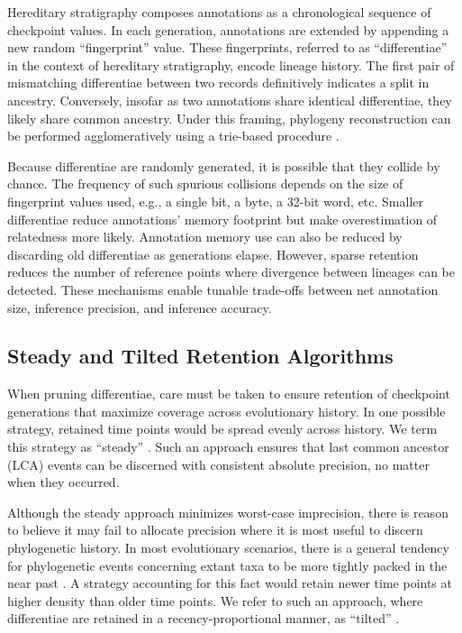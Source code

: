 Hereditary stratigraphy composes annotations as a chronological sequence of checkpoint values.
In each generation, annotations are extended by appending a new random ``fingerprint'' value.
These fingerprints, referred to as ``differentiae'' in the context of hereditary stratigraphy, encode lineage history.
The first pair of mismatching differentiae between two records definitively indicates a split in ancestry.
Conversely, insofar as two annotations share identical differentiae, they likely share common ancestry.
Under this framing, phylogeny reconstruction can be performed agglomeratively using a trie-based procedure \citep{moreno2024analysis}.

Because differentiae are randomly generated, it is possible that they collide by chance.
The frequency of such spurious collisions depends on the size of fingerprint values used, e.g., a single bit, a byte, a 32-bit word, etc.
Smaller differentiae reduce annotations' memory footprint but make overestimation of relatedness more likely.
Annotation memory use can also be reduced by discarding old differentiae as generations elapse.
However, sparse retention reduces the number of reference points where divergence between lineages can be detected.
These mechanisms enable tunable trade-offs between net annotation size, inference precision, and inference accuracy.

\subsection{Steady and Tilted Retention Algorithms}
\label{sec:methods-steady-vs-tilted-algorithms}



When pruning differentiae, care must be taken to ensure retention of checkpoint generations that maximize coverage across evolutionary history.
In one possible strategy, retained time points would be spread evenly across history.
We term this strategy as ``steady'' \citep{han2005stream,zhao2005generalized}.
Such an approach ensures that last common ancestor (LCA) events can be discerned with consistent absolute precision, no matter when they occurred.

Although the steady approach minimizes worst-case imprecision, there is reason to believe it may fail to allocate precision where it is most useful to discern phylogenetic history.
In most evolutionary scenarios, there is a general tendency for phylogenetic events concerning extant taxa to be more tightly packed in the near past \citep{zhaxybayeva2004cladogenesis}.
A strategy accounting for this fact would retain newer time points at higher density than older time points.
We refer to such an approach, where differentiae are retained in a recency-proportional manner, as ``tilted'' \citep{han2005stream,zhao2005generalized}.

